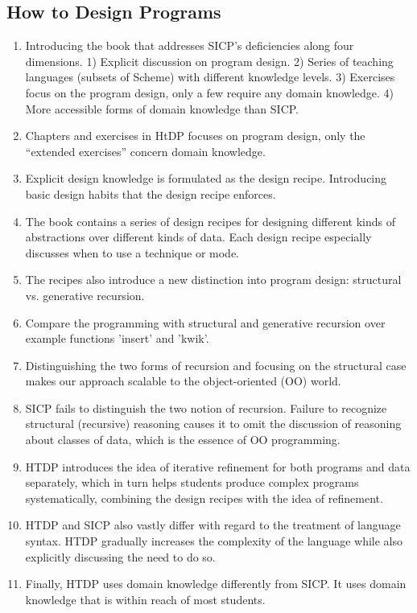 \documentclass{article}
\begin{document}
\subsection{How to Design Programs}

\begin{enumerate}
\item Introducing the book that addresses SICP's deficiencies along
  four dimensions. 1) Explicit discussion on program design. 2) Series
  of teaching languages (subsets of Scheme) with different knowledge
  levels. 3) Exercises focus on the program design, only a few require
  any domain knowledge. 4) More accessible forms of domain knowledge
  than SICP.
\item Chapters and exercises in HtDP focuses on program design, only
  the ``extended exercises'' concern domain knowledge.
\item Explicit design knowledge is formulated as the design
  recipe. Introducing basic design habits that the design recipe
  enforces.
\item The book contains a series of design recipes for designing
  different kinds of abstractions over different kinds of data. Each
  design recipe especially discusses when to use a technique or mode.
\item The recipes also introduce a new distinction into program
  design: structural vs. generative recursion.
\item Compare the programming with structural and generative recursion
  over example functions 'insert' and 'kwik'.
\item Distinguishing the two forms of recursion and focusing on the
  structural case makes our approach scalable to the object-oriented
  (OO) world.
\item SICP fails to distinguish the two notion of recursion. Failure
  to recognize structural (recursive) reasoning causes it to omit the
  discussion of reasoning about classes of data, which is the essence
  of OO programming.
\item HTDP introduces the idea of iterative refinement for both
  programs and data separately, which in turn helps students produce
  complex programs systematically, combining the design recipes with
  the idea of refinement.
\item HTDP and SICP also vastly differ with regard to the treatment of
  language syntax. HTDP gradually increases the complexity of the
  language while also explicitly discussing the need to do so.
\item Finally, HTDP uses domain knowledge differently from SICP. It
  uses domain knowledge that is within reach of most students.
\end{enumerate}
\end{document}
